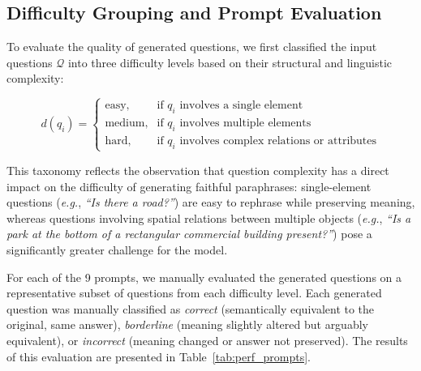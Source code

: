 \subsection{Difficulty Grouping and Prompt Evaluation}
\label{sec:chap3_difficulty}
 
To evaluate the quality of generated questions, we
first classified the input questions $\mathcal{Q}$
into three difficulty levels based on their structural
and linguistic complexity:
 
\begin{equation}
d(q_i) =
\begin{cases}
\text{easy,}   & \text{if } q_i \text{ involves a single element} \\
\text{medium,} & \text{if } q_i \text{ involves multiple elements} \\
\text{hard,}   & \text{if } q_i \text{ involves complex relations or attributes}
\end{cases}
\end{equation}
 
This taxonomy reflects the observation that question
complexity has a direct impact on the difficulty of
generating faithful paraphrases: single-element
questions (\textit{e.g.}, \textit{``Is there a road?''})
are easy to rephrase while preserving meaning, whereas
questions involving spatial relations between multiple
objects (\textit{e.g.}, \textit{``Is a park at the bottom
of a rectangular commercial building present?''}) pose
a significantly greater challenge for the model.
 
For each of the 9 prompts, we manually evaluated the
generated questions on a representative subset of
questions from each difficulty level. Each generated
question was manually classified as \textit{correct}
(semantically equivalent to the original, same answer),
\textit{borderline} (meaning slightly altered but
arguably equivalent), or \textit{incorrect} (meaning
changed or answer not preserved). The results of this
evaluation are presented in Table~\ref{tab:perf_prompts}.

